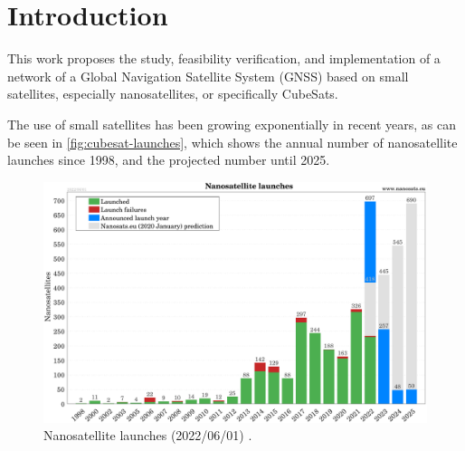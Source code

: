 %
%
%
%
%

%
%
%
%
%

\chapter{Introduction} \label{ch:introduction}

This work proposes the study, feasibility verification, and implementation of a network of a Global Navigation Satellite System (GNSS) based on small satellites, especially nanosatellites, or specifically CubeSats.

The use of small satellites has been growing exponentially in recent years, as can be seen in \autoref{fig:cubesat-launches}, which shows the annual number of nanosatellite launches since 1998, and the projected number until 2025.

\begin{figure}[!ht]
    \begin{center}
        \includegraphics[width=\columnwidth]{figures/Nanosats_years_2022-06-01}
        \caption{Nanosatellite launches (2022/06/01) \cite{nanosatseu}.}
        \label{fig:cubesat-launches}
    \end{center}
\end{figure}

